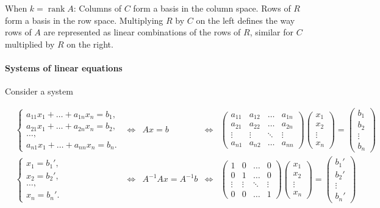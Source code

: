 \documentclass{article}
\begin{document}
When $k = \operatorname{rank} A$: Columns of $C$ form a basis in the column space. Rows of $R$ form a basis in the row space. Multiplying $R$ by $C$ on the left defines the way rows of $A$ are represented as linear combinations of the rows of $R$, similar for $C$ multiplied by $R$ on the right.

\paragraph{Systems of linear equations} Consider a system

\begin{align*}
&\begin{cases}
a_{11} x_1 + \dots + a_{1n} x_n = b_1, \\
a_{21} x_1 + \dots + a_{2n} x_n = b_2, \\
\dots, \\
a_{n1} x_1 + \dots + a_{nn} x_n = b_n.
\end{cases} &\iff& Ax = b &\iff&
\begin{pmatrix}
    a_{11} & a_{12} & \dots & a_{1n} \\
    a_{21} & a_{22} & \dots & a_{2n} \\
    \vdots & \vdots & \ddots & \vdots \\
    a_{n1} & a_{n2} & \dots & a_{nn}
\end{pmatrix} \begin{pmatrix}
    x_1 \\ x_2 \\ \vdots \\ x_n
\end{pmatrix} = \begin{pmatrix}
    b_1 \\ b_2 \\ \vdots \\ b_n
\end{pmatrix}& \\
&\begin{cases}
x_1 = b_1', \\
x_2 = b_2', \\
\dots, \\
x_n = b_n'.
\end{cases} &\iff& A^{-1} A x = A^{-1} b &\iff& \begin{pmatrix}
    1 & 0 & \dots & 0 \\
    0 & 1 & \dots & 0 \\
    \vdots & \vdots & \ddots & \vdots \\
    0 & 0 & \dots & 1
\end{pmatrix} \begin{pmatrix}
    x_1 \\ x_2 \\ \vdots \\ x_n
\end{pmatrix} = \begin{pmatrix}
    b_1' \\ b_2' \\ \vdots \\ b_n'
\end{pmatrix}&
\end{align*}
\end{document}
